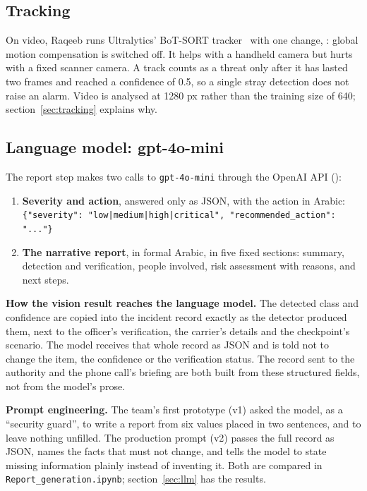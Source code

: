 \documentclass[11pt,a4paper]{article}
\newcommand{\code}[1]{\texttt{#1}}
\begin{document}
\subsection{Tracking}

On video, Raqeeb runs Ultralytics' BoT-SORT tracker~\cite{botsort} with one change,
: global motion compensation is switched off. It helps with a
handheld camera but hurts with a fixed scanner camera. A track counts as a threat only after it has
lasted two frames and reached a confidence of 0.5, so a single stray detection does not raise an
alarm. Video is analysed at 1280 px rather than the training size of 640; section~\ref{sec:tracking}
explains why.

\subsection{Language model: gpt-4o-mini}

The report step makes two calls to \code{gpt-4o-mini} through the OpenAI API
():

\begin{enumerate}
  \item \textbf{Severity and action}, answered only as JSON, with the action in Arabic:\\[0.2em]
        {\small\code{\{"severity": "low|medium|high|critical", "recommended\_action": "..."\}}}
  \item \textbf{The narrative report}, in formal Arabic, in five fixed sections: summary, detection and
        verification, people involved, risk assessment with reasons, and next steps.
\end{enumerate}

\textbf{How the vision result reaches the language model.} The detected class and confidence are
copied into the incident record exactly as the detector produced them, next to the officer's
verification, the carrier's details and the checkpoint's scenario. The model receives that whole
record as JSON and is told not to change the item, the confidence or the verification status. The
record sent to the authority and the phone call's briefing are both built from these structured
fields, not from the model's prose.

\textbf{Prompt engineering.} The team's first prototype (v1) asked the model, as a ``security
guard'', to write a report from six values placed in two sentences, and to leave nothing unfilled.
The production prompt (v2) passes the full record as JSON, names the facts that must not change, and
tells the model to state missing information plainly instead of inventing it. Both are compared in
\code{Report\_generation.ipynb}; section~\ref{sec:llm} has the results.
\end{document}
